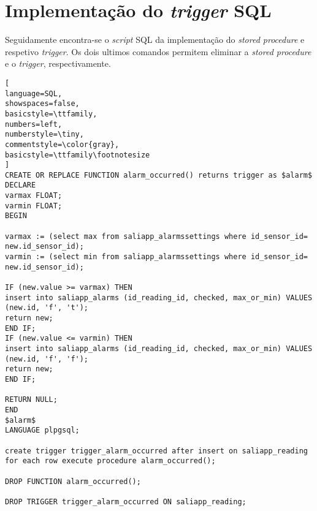 \chapter{Implementação do \textit{trigger} \acs{SQL} }
\label{triggerSQLImpe}


Seguidamente encontra-se o \textit{script} SQL da implementação do \textit{stored procedure} e respetivo \textit{trigger}. Os dois ultimos comandos permitem eliminar a \textit{stored procedure} e o \textit{trigger}, respectivamente. 

\begin{lstlisting}[
language=SQL,
showspaces=false,
basicstyle=\ttfamily,
numbers=left,
numberstyle=\tiny,
commentstyle=\color{gray},
basicstyle=\ttfamily\footnotesize
]
CREATE OR REPLACE FUNCTION alarm_occurred() returns trigger as $alarm$ 
DECLARE
varmax FLOAT;
varmin FLOAT;
BEGIN

varmax := (select max from saliapp_alarmssettings where id_sensor_id= new.id_sensor_id);
varmin := (select min from saliapp_alarmssettings where id_sensor_id= new.id_sensor_id);

IF (new.value >= varmax) THEN 
insert into saliapp_alarms (id_reading_id, checked, max_or_min) VALUES (new.id, 'f', 't');
return new;
END IF;
IF (new.value <= varmin) THEN 
insert into saliapp_alarms (id_reading_id, checked, max_or_min) VALUES (new.id, 'f', 'f');
return new;
END IF;

RETURN NULL;
END
$alarm$
LANGUAGE plpgsql;

create trigger trigger_alarm_occurred after insert on saliapp_reading
for each row execute procedure alarm_occurred(); 

DROP FUNCTION alarm_occurred(); 

DROP TRIGGER trigger_alarm_occurred ON saliapp_reading;


\end{lstlisting}
